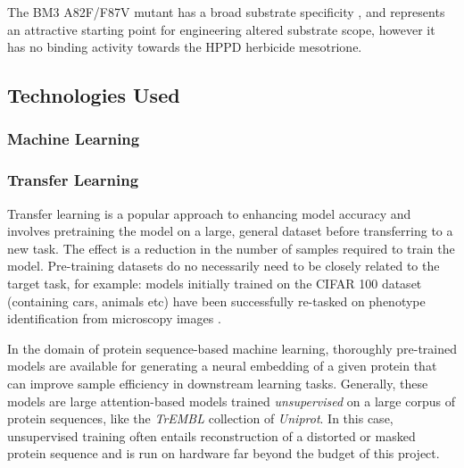 \documentclass{article}
\begin{document}
The BM3 A82F/F87V mutant has a broad substrate specificity \cite{butler2013key}, and represents an attractive starting point for engineering altered substrate scope, however it has no binding activity towards the HPPD herbicide mesotrione. %

\subsection{Technologies Used}
\subsubsection{Machine Learning}
\subsubsection{Transfer Learning}


Transfer learning is a popular approach to enhancing model accuracy and involves pretraining the model on a large, general dataset before transferring to a new task. 
The effect is a reduction in the number of samples required to train the model. 
Pre-training datasets do no necessarily need to be closely related to the target task, for example: models initially trained on the CIFAR 100 dataset (containing cars, animals etc) have been successfully re-tasked on phenotype identification from microscopy images \cite{ng2016nuts}. %

In the domain of protein sequence-based machine learning, thoroughly pre-trained models are available for generating a neural embedding of a given protein that can improve sample efficiency in downstream learning tasks.
Generally, these models are large attention-based models trained \textit{unsupervised} on a large corpus of protein sequences, like the \textit{TrEMBL} collection of \textit{Uniprot}.
In this case, unsupervised training often entails reconstruction of a distorted or masked protein sequence and is run on hardware far beyond the budget of this project.
\end{document}

